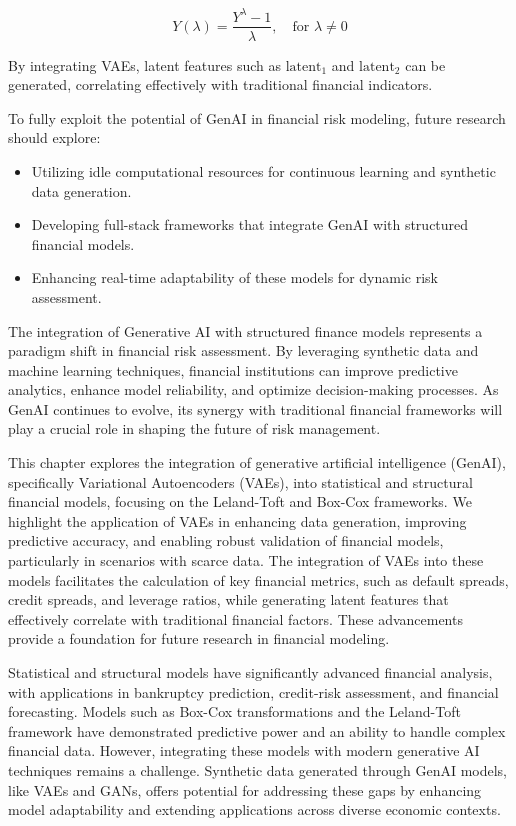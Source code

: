 \documentclass[a4paper,headinclude=on,footinclude=on,12pt,oneside]{scrbook}
\begin{document}
	\begin{equation}
		Y(\lambda) = \frac{Y^{\lambda} - 1}{\lambda}, \quad \text{for } \lambda \neq 0
	\end{equation}
	
	By integrating VAEs, latent features such as $\text{latent}_1$ and $\text{latent}_2$ can be generated, correlating effectively with traditional financial indicators.
	
	To fully exploit the potential of GenAI in financial risk modeling, future research should explore:
	\begin{itemize}
		\item Utilizing idle computational resources for continuous learning and synthetic data generation.
		\item Developing full-stack frameworks that integrate GenAI with structured financial models.
		\item Enhancing real-time adaptability of these models for dynamic risk assessment.
	\end{itemize}
	
	The integration of Generative AI with structured finance models represents a paradigm shift in financial risk assessment. By leveraging synthetic data and machine learning techniques, financial institutions can improve predictive analytics, enhance model reliability, and optimize decision-making processes. As GenAI continues to evolve, its synergy with traditional financial frameworks will play a crucial role in shaping the future of risk management.
	
	
	This chapter explores the integration of generative artificial intelligence (GenAI), specifically Variational Autoencoders (VAEs), into statistical and structural financial models, focusing on the Leland-Toft and Box-Cox frameworks. We highlight the application of VAEs in enhancing data generation, improving predictive accuracy, and enabling robust validation of financial models, particularly in scenarios with scarce data. The integration of VAEs into these models facilitates the calculation of key financial metrics, such as default spreads, credit spreads, and leverage ratios, while generating latent features that effectively correlate with traditional financial factors. These advancements provide a foundation for future research in financial modeling.
	
	Statistical and structural models have significantly advanced financial analysis, with applications in bankruptcy prediction, credit-risk assessment, and financial forecasting. Models such as Box-Cox transformations and the Leland-Toft framework have demonstrated predictive power and an ability to handle complex financial data. However, integrating these models with modern generative AI techniques remains a challenge. Synthetic data generated through GenAI models, like VAEs and GANs, offers potential for addressing these gaps by enhancing model adaptability and extending applications across diverse economic contexts.
	
\end{document}
